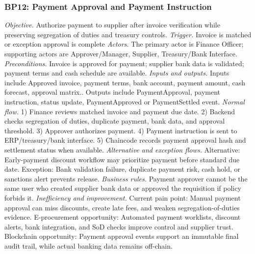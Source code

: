 \documentclass[conference]{IEEEtran}
\begin{document}
\subsubsection{BP12: Payment Approval and Payment Instruction}
\textit{Objective.} Authorize payment to supplier after invoice verification while preserving segregation of duties and treasury controls.
\textit{Trigger.} Invoice is matched or exception approval is complete
\textit{Actors.} The primary actor is Finance Officer; supporting actors are Approver/Manager, Supplier, Treasury/Bank Interface.
\textit{Preconditions.} Invoice is approved for payment; supplier bank data is validated; payment terms and cash schedule are available.
\textit{Inputs and outputs.} Inputs include Approved invoice, payment terms, bank account, payment amount, cash forecast, approval matrix.. Outputs include PaymentApproval, payment instruction, status update, PaymentApproved or PaymentSettled event.
\textit{Normal flow.} 1) Finance reviews matched invoice and payment due date. 2) Backend checks segregation of duties, duplicate payment, bank data, and approval threshold. 3) Approver authorizes payment. 4) Payment instruction is sent to ERP/treasury/bank interface. 5) Chaincode records payment approval hash and settlement status when available.
\textit{Alternative and exception flows.} Alternative: Early-payment discount workflow may prioritize payment before standard due date. Exception: Bank validation failure, duplicate payment risk, cash hold, or sanctions alert prevents release.
\textit{Business rules.} Payment approver cannot be the same user who created supplier bank data or approved the requisition if policy forbids it.
\textit{Inefficiency and improvement.} Current pain point: Manual payment approval can miss discounts, create late fees, and weaken segregation-of-duties evidence. E-procurement opportunity: Automated payment worklists, discount alerts, bank integration, and SoD checks improve control and supplier trust. Blockchain opportunity: Payment approval events support an immutable final audit trail, while actual banking data remains off-chain.
\end{document}
